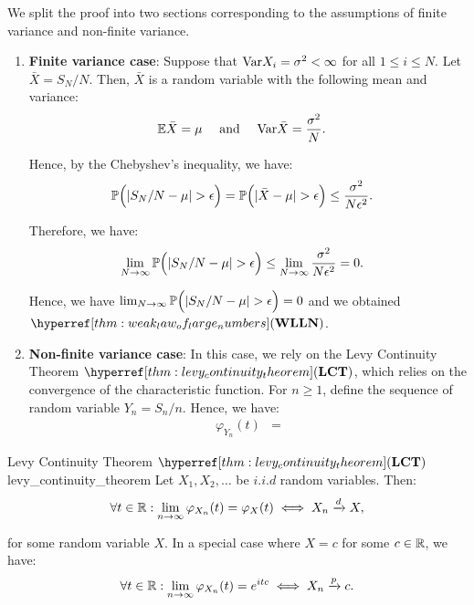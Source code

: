 \begin{proof*}
    We split the proof into two sections corresponding to the assumptions of finite variance and non-finite variance.
    \begin{enumerate}
        \item \textbf{Finite variance case}:
        Suppose that $\mathrm{Var} X_i = \sigma^2<\infty$ for all $1\le i \le N$. Let $\bar X = S_N/N$. Then, $\bar X$ is a random variable with the following mean and variance:
        \begin{align*}
            \mathbb{E}\bar X &= \mu \quad \text{ and } \quad \mathrm{Var} \bar X = \frac{\sigma^2}{N}.
        \end{align*}

        \noindent Hence, by the Chebyshev's inequality, we have:
        \begin{align*}
            \mathbb{P}\Big( |S_N/N - \mu| > \epsilon \Big) &= \mathbb{P}\Big( |\bar X - \mu| > \epsilon \Big) \le \frac{\sigma^2}{N\epsilon^2}.
        \end{align*}

        \noindent Therefore, we have:
        \begin{align*}
            \lim_{N\to\infty}\mathbb{P}\Big( |S_N/N - \mu| > \epsilon \Big) &\le \lim_{N\to\infty}\frac{\sigma^2}{N\epsilon^2} = 0.
        \end{align*}

        \noindent Hence, we have $\lim_{N\to\infty}\mathbb{P}\Big( |S_N/N - \mu| > \epsilon \Big)=0$ and we obtained $\WLLN$.

        \item \textbf{Non-finite variance case}: In this case, we rely on the Levy Continuity Theorem $\LCT$, which relies on the convergence of the characteristic function. For $n\ge1$, define the sequence of random variable $Y_n=S_n/n$. Hence, we have:
        \begin{align*}
            \varphi_{Y_n}(t) &=
        \end{align*}
    \end{enumerate}
\end{proof*}

\begin{theorem}{Levy Continuity Theorem $\LCT$}{levy_continuity_theorem}
    Let $X_1, X_2, \dots$ be $i.i.d$ random variables. Then:
    \begin{equation}
        \forall t \in \mathbb{R}: \lim_{n\to\infty}\varphi_{X_n}(t) = \varphi_X(t) \iff X_n \xrightarrow{d} X,
    \end{equation}

    \noindent for some random variable $X$. In a special case where $X = c$ for some $c\in \mathbb{R}$, we have:
    \begin{equation}
        \forall t \in \mathbb{R} : \lim_{n\to\infty} \varphi_{X_n}(t) = e^{itc} \iff X_n \xrightarrow{p} c.
    \end{equation}
\end{theorem}

